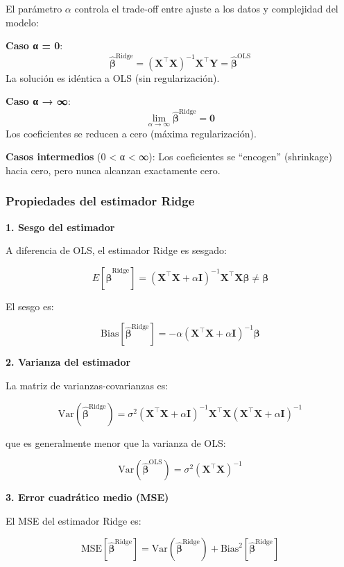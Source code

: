 \documentclass[
  doc,
  floatsintext,
  longtable,
  a4paper,
  nolmodern,
  notxfonts,
  notimes,
  12pt,
  colorlinks=true,linkcolor=blue,citecolor=blue,urlcolor=blue]{apa7}
\begin{document}
El parámetro \(\alpha\) controla el trade-off entre ajuste a los datos y
complejidad del modelo:

\textbf{Caso α = 0}: \[
\hat{\boldsymbol{\beta}}^{\text{Ridge}} = (\mathbf{X}^\top\mathbf{X})^{-1}\mathbf{X}^\top\mathbf{Y} = \hat{\boldsymbol{\beta}}^{\text{OLS}}
\] La solución es idéntica a OLS (sin regularización).

\textbf{Caso α → ∞}: \[
\lim_{\alpha \to \infty} \hat{\boldsymbol{\beta}}^{\text{Ridge}} = \mathbf{0}
\] Los coeficientes se reducen a cero (máxima regularización).

\textbf{Casos intermedios} (0 \textless{} α \textless{} ∞): Los
coeficientes se ``encogen'' (shrinkage) hacia cero, pero nunca alcanzan
exactamente cero.

\subsubsection{Propiedades del estimador
Ridge}\label{propiedades-del-estimador-ridge}

\textbf{1. Sesgo del estimador}

A diferencia de OLS, el estimador Ridge es sesgado:

\[
E[\hat{\boldsymbol{\beta}}^{\text{Ridge}}] = (\mathbf{X}^\top\mathbf{X} + \alpha\mathbf{I})^{-1}\mathbf{X}^\top\mathbf{X}\boldsymbol{\beta} \neq \boldsymbol{\beta}
\]

El sesgo es:

\[
\text{Bias}[\hat{\boldsymbol{\beta}}^{\text{Ridge}}] = -\alpha(\mathbf{X}^\top\mathbf{X} + \alpha\mathbf{I})^{-1}\boldsymbol{\beta}
\]

\textbf{2. Varianza del estimador}

La matriz de varianzas-covarianzas es:

\[
\text{Var}(\hat{\boldsymbol{\beta}}^{\text{Ridge}}) = \sigma^2 (\mathbf{X}^\top\mathbf{X} + \alpha\mathbf{I})^{-1} \mathbf{X}^\top\mathbf{X} (\mathbf{X}^\top\mathbf{X} + \alpha\mathbf{I})^{-1}
\]

que es generalmente menor que la varianza de OLS:

\[
\text{Var}(\hat{\boldsymbol{\beta}}^{\text{OLS}}) = \sigma^2 (\mathbf{X}^\top\mathbf{X})^{-1}
\]

\textbf{3. Error cuadrático medio (MSE)}

El MSE del estimador Ridge es:

\[
\text{MSE}[\hat{\boldsymbol{\beta}}^{\text{Ridge}}] = \text{Var}(\hat{\boldsymbol{\beta}}^{\text{Ridge}}) + \text{Bias}^2[\hat{\boldsymbol{\beta}}^{\text{Ridge}}]
\]
\end{document}
